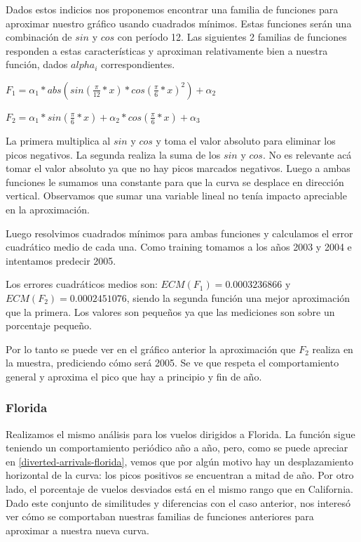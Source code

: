 Dados estos indicios nos proponemos encontrar una familia de funciones para aproximar nuestro gr\'afico usando cuadrados m\'inimos. Estas funciones ser\'an una combinaci\'on de $sin$ y $cos$ con per\'iodo 12. Las siguientes 2 familias de funciones responden a estas caracter\'isticas y aproximan relativamente bien a nuestra funci\'on, dados $alpha_i$ correspondientes.


$F_1 = \alpha_1 * abs(sin(\frac{\pi}{12}*x) * cos(\frac{\pi}{6}*x)^2) + \alpha_2$

$F_2 = \alpha_1 * sin(\frac{\pi}{6}*x) + \alpha_2 * cos(\frac{\pi}{6}*x) + \alpha_3$


La primera multiplica al $sin$ y $cos$ y toma el valor absoluto para eliminar los picos negativos. La segunda realiza la suma de los $sin$ y $cos$. No es relevante ac\'a tomar el valor absoluto ya que no hay picos marcados negativos. Luego a ambas funciones le sumamos una constante para que la curva se desplace en direcci\'on vertical. Observamos que sumar una variable lineal no ten\'ia impacto apreciable en la aproximaci\'on. 

Luego resolvimos cuadrados m\'inimos para ambas funciones y calculamos el error cuadr\'atico medio de cada una. Como training tomamos a los años 2003 y 2004 e intentamos predecir 2005.

Los errores cuadr\'aticos medios son: $ECM(F_1) = 0.0003236866$ y $ECM(F_2) = 0.0002451076$, siendo la segunda funci\'on una mejor aproximaci\'on que la primera. Los valores son pequeños ya que las mediciones son sobre un porcentaje pequeño.

Por lo tanto se puede ver en el gr\'afico anterior la aproximaci\'on que $F_2$ realiza en la muestra, prediciendo c\'omo ser\'a 2005. Se ve que respeta el comportamiento general y aproxima el pico que hay a principio y fin de año.

\subsubsection{Florida}

Realizamos el mismo an\'alisis para los vuelos dirigidos a Florida. La funci\'on sigue teniendo un comportamiento peri\'odico a\~no a a\~no, pero, como se puede apreciar en \ref{diverted-arrivals-florida}, vemos que por alg\'un motivo hay un desplazamiento horizontal de la curva: los picos positivos se encuentran a mitad de a\~no.
Por otro lado, el porcentaje de vuelos desviados est\'a en el mismo rango que en California.
Dado este conjunto de similitudes y diferencias con el caso anterior, nos interes\'o ver c\'omo se comportaban nuestras familias de funciones anteriores para aproximar a nuestra nueva curva.

